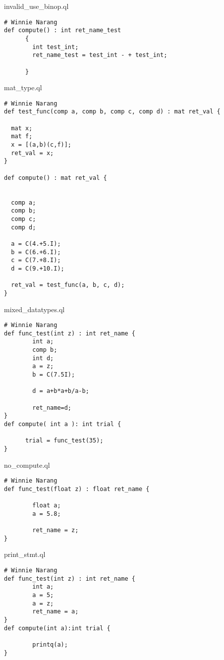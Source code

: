 invalid\_use\_binop.ql
\begin{lstlisting}
# Winnie Narang
def compute() : int ret_name_test
      {
        int test_int;
        ret_name_test = test_int - + test_int;
        
      }
\end{lstlisting}
mat\_type.ql
\begin{lstlisting}
# Winnie Narang
def test_func(comp a, comp b, comp c, comp d) : mat ret_val { 

  mat x;
  mat f;
  x = [(a,b)(c,f)];
  ret_val = x;
}

def compute() : mat ret_val {


  comp a;
  comp b;
  comp c;
  comp d;

  a = C(4.+5.I);
  b = C(6.+6.I);
  c = C(7.+8.I);
  d = C(9.+10.I);

  ret_val = test_func(a, b, c, d);
}
\end{lstlisting}
mixed\_datatypes.ql
\begin{lstlisting}
# Winnie Narang
def func_test(int z) : int ret_name { 
        int a;
        comp b;
        int d;
        a = z;
        b = C(7.5I);
        
        d = a+b*a+b/a-b;

        ret_name=d;
}
def compute( int a ): int trial {
      
      trial = func_test(35);
}
\end{lstlisting}
no\_compute.ql
\begin{lstlisting}
# Winnie Narang
def func_test(float z) : float ret_name { 
        
        float a; 
        a = 5.8;
       
        ret_name = z;  
}
\end{lstlisting}
print\_stmt.ql
\begin{lstlisting}
# Winnie Narang
def func_test(int z) : int ret_name { 
        int a; 
        a = 5; 
        a = z;
        ret_name = a;        
}
def compute(int a):int trial {
   
        printq(a);
}
\end{lstlisting}

